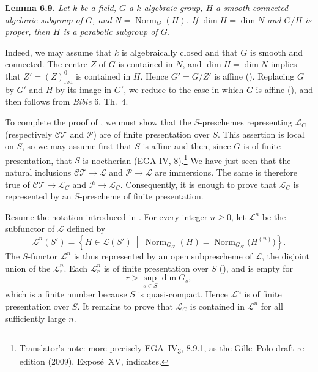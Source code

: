 \textbf{Lemma 6.9.} \emph{Let \(k\) be a field, \(G\) a \(k\)-algebraic group,
\(H\) a smooth connected algebraic subgroup of \(G\), and
\(N=\operatorname{Norm}_G(H)\). If \(\dim H=\dim N\) and \(G/H\) is proper, then
\(H\) is a parabolic subgroup of \(G\).}

Indeed, we may assume that \(k\) is algebraically closed and that \(G\) is smooth
and connected. The centre \(Z\) of \(G\) is contained in \(N\), and
\(\dim H=\dim N\) implies that \(Z'=(Z)^0_{\mathrm{red}}\) is contained in \(H\).
Hence \(G'=G/Z'\) is affine (). Replacing \(G\) by \(G'\) and \(H\)
by its image in \(G'\), we reduce to the case in which \(G\) is affine
(), and  then follows from \emph{Bible} 6, Th.~4.

To complete the proof of , we must show that the \(S\)-preschemes representing
\(\mathcal L_C\) (respectively \(\mathcal{CT}\) and \(\mathcal P\)) are of finite
presentation over \(S\). This assertion is local on \(S\), so we may assume first
that \(S\) is affine and then, since \(G\) is of finite presentation, that \(S\) is
noetherian (EGA IV, 8).\footnote{Translator's note: more precisely EGA~IV\textsubscript{3}, 8.9.1, as the Gille--Polo draft re-edition (2009), Exposé~XV, indicates.} We have just seen that the natural inclusions
\(\mathcal{CT}\to\mathcal L\) and \(\mathcal P\to\mathcal L\) are immersions.
The same is therefore true of
\(\mathcal{CT}\to\mathcal L_C\) and \(\mathcal P\to\mathcal L_C\).
Consequently, it is enough to prove that \(\mathcal L_C\) is represented by an
\(S\)-prescheme of finite presentation.

Resume the notation introduced in . For every integer \(n\geq 0\), let
\(\mathcal L^n\) be the subfunctor of \(\mathcal L\) defined by
\[
\mathcal L^n(S')
 =\left\{H\in\mathcal L(S')\ \middle|\ 
   \operatorname{Norm}_{G_{S'}}(H)
   =\operatorname{Norm}_{G_{S'}}\bigl(H^{(n)}\bigr)\right\}.
\]
The \(S\)-functor \(\mathcal L^n\) is thus represented by an open subprescheme
of \(\mathcal L\), the disjoint union of the \(\mathcal L_r^n\).
Each \(\mathcal L_r^n\) is of finite presentation over \(S\) (), and is empty
for
\[
r>\sup_{s\in S}\dim G_s,
\]
which is a finite number because \(S\) is quasi-compact. Hence \(\mathcal L^n\)
is of finite presentation over \(S\). It remains to prove that
\(\mathcal L_C\) is contained in \(\mathcal L^n\) for all sufficiently large
\(n\).

